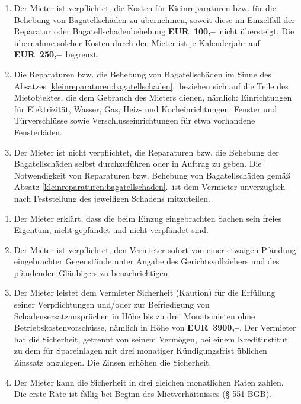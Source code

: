 \documentclass{scrreprt}[12pt,a4paper,twoside,duplex]
\newcommand{\mietWaehrung}{\textcolor{zuBearbeiten}{EUR}}
\newcommand{\mietKaution}{\textcolor{zuBearbeiten}{3900,--}}
\newcommand{\kleinreparaturBagatellschadenBetrag}{\textcolor{zuBearbeiten}{100,--}}
\newcommand{\kleinreparaturBagatellschadenBetragObergrenze}{\textcolor{zuBearbeiten}{250,--}}
\begin{document}
\begin{contract}
\begin{enumerate}
  \item\label{kleinreparaturen:bagatellschaden} Der Mieter ist verpflichtet,
  die Kosten für Kieinreparaturen bzw. für
  die Behebung von Bagatellschäden zu übernehmen, soweit diese im Einzelfall der
  Reparatur oder Bagatellschadenbehebung \textbf{\mietWaehrung\
  \kleinreparaturBagatellschadenBetrag}\ nicht übersteigt. Die übernahme solcher
  Kosten durch den Mieter ist je Kalenderjahr auf
  \textbf{\mietWaehrung\ \kleinreparaturBagatellschadenBetragObergrenze}\ begrenzt.
  \item Die Reparaturen bzw. die Behebung von Bagatellschäden im Sinne des
  Absatzes \ref{kleinreparaturen:bagatellschaden}.\ beziehen sich auf die Teile
  des Mietobjektes, die dem Gebrauch des Mieters dienen, nämlich: Einrichtungen
  für Elektrizität, Wasser, Gas, Heiz- und Kocheinrichtungen, Fenster und
  Türverschlüsse sowie Verschlusseinrichtungen für etwa vorhandene Fensterläden.
  \item Der Mieter ist nicht verpflichtet, die Reparaturen bzw. die Behebung der
  Bagatellschäden selbst durchzuführen oder in Auftrag zu geben. Die
  Notwendigkeit von Reparaturen bzw. Behebung von Bagatellschäden gemäß Absatz
  \ref{kleinreparaturen:bagatellschaden}.\ ist dem Vermieter unverzüglich nach
  Feststellung des jeweiligen Schadens mitzuteilen.
\end{enumerate}
\end{contract}

\begin{contract}
\begin{enumerate}
  \item Der Mieter erklärt, dass die beim Einzug eingebrachten Sachen sein
  freies Eigentum, nicht gepfändet und nicht verpfändet sind.%
  \item Der Mieter ist verpflichtet, den Vermieter sofort von einer etwaigen
  Pfändung eingebrachter Gegenstände unter Angabe des Gerichtsvollziehers und
  des pfändenden Gläubigers zu benachrichtigen.
  \item Der Mieter leistet dem Vermieter Sicherheit (Kaution) für die Erfüllung
  seiner Verpflichtungen und/oder zur Befriedigung von Schadensersatzansprüchen
  in Höhe bis zu drei Monatsmieten ohne Betriebskostenvorschüsse, nämlich in
  Höhe von \textbf{\mietWaehrung\ \mietKaution}. Der Vermieter hat die Sicherheit,
  getrennt von seinem Vermögen, bei einem Kreditinstitut zu dem für Spareinlagen
  mit drei monatiger Kündigungsfrist üblichen Zinssatz anzulegen. Die Zinsen
  erhöhen die Sicherheit.
  \item Der Mieter kann die Sicherheit in drei gleichen monatlichen Raten
  zahlen. Die erste Rate ist fällig bei Beginn des Mietverhäitnisses
  (§ 551 BGB).
\end{enumerate}
\end{contract}
\end{document}
